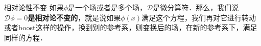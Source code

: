 
\begin{definition}{相对论性不变}
如果$\phi$是一个场或者是多个场，$\mathcal D$是微分算符．那么，我们说\textbf{$\mathcal D \phi = 0$是相对论不变的}，就是说如果$\phi(x)$满足这个方程，我们再对它进行转动或者boost这样的操作，换到别的参考系，则变换后的场，在新的参考系下，满足同样的方程．
\end{definition}